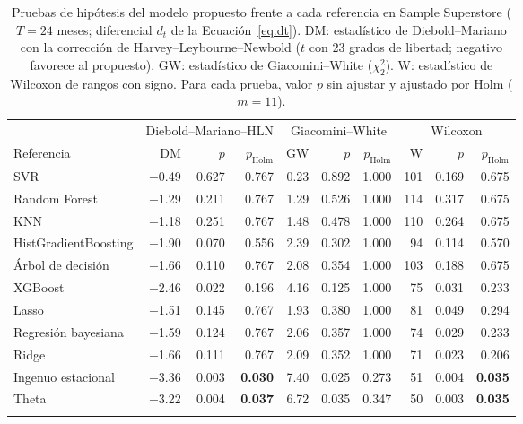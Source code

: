 \documentclass[pdflatex,sn-mathphys-num]{sn-jnl}
\theoremstyle{thmstyleone}
\begin{document}
\begin{table}[!htb]
\caption{Pruebas de hipótesis del modelo propuesto frente a cada referencia en Sample Superstore ($T=24$ meses; diferencial $d_t$ de la Ecuación~\eqref{eq:dt}). DM: estadístico de Diebold--Mariano con la corrección de Harvey--Leybourne--Newbold ($t$ con 23 grados de libertad; negativo favorece al propuesto). GW: estadístico de Giacomini--White ($\chi^2_2$). W: estadístico de Wilcoxon de rangos con signo. Para cada prueba, valor $p$ sin ajustar y ajustado por Holm ($m=11$).}\label{tab:pruebas}
\scriptsize
\begin{tabular*}{\textwidth}{@{\extracolsep\fill}lrrrrrrrrr}
\toprule
& \multicolumn{3}{c}{Diebold--Mariano--HLN} & \multicolumn{3}{c}{Giacomini--White} & \multicolumn{3}{c}{Wilcoxon} \\
\cmidrule(lr){2-4}\cmidrule(lr){5-7}\cmidrule(lr){8-10}
Referencia & DM & $p$ & $p_{\mathrm{Holm}}$ & GW & $p$ & $p_{\mathrm{Holm}}$ & W & $p$ & $p_{\mathrm{Holm}}$ \\
\midrule
SVR & $-$0.49 & 0.627 & 0.767 & 0.23 & 0.892 & 1.000 & 101 & 0.169 & 0.675 \\
Random Forest & $-$1.29 & 0.211 & 0.767 & 1.29 & 0.526 & 1.000 & 114 & 0.317 & 0.675 \\
KNN & $-$1.18 & 0.251 & 0.767 & 1.48 & 0.478 & 1.000 & 110 & 0.264 & 0.675 \\
HistGradientBoosting & $-$1.90 & 0.070 & 0.556 & 2.39 & 0.302 & 1.000 & 94 & 0.114 & 0.570 \\
Árbol de decisión & $-$1.66 & 0.110 & 0.767 & 2.08 & 0.354 & 1.000 & 103 & 0.188 & 0.675 \\
XGBoost & $-$2.46 & 0.022 & 0.196 & 4.16 & 0.125 & 1.000 & 75 & 0.031 & 0.233 \\
Lasso & $-$1.51 & 0.145 & 0.767 & 1.93 & 0.380 & 1.000 & 81 & 0.049 & 0.294 \\
Regresión bayesiana & $-$1.59 & 0.124 & 0.767 & 2.06 & 0.357 & 1.000 & 74 & 0.029 & 0.233 \\
Ridge & $-$1.66 & 0.111 & 0.767 & 2.09 & 0.352 & 1.000 & 71 & 0.023 & 0.206 \\
Ingenuo estacional & $-$3.36 & 0.003 & \textbf{0.030} & 7.40 & 0.025 & 0.273 & 51 & 0.004 & \textbf{0.035} \\
Theta & $-$3.22 & 0.004 & \textbf{0.037} & 6.72 & 0.035 & 0.347 & 50 & 0.003 & \textbf{0.035} \\
\botrule
\end{tabular*}
\end{table}
\end{document}

